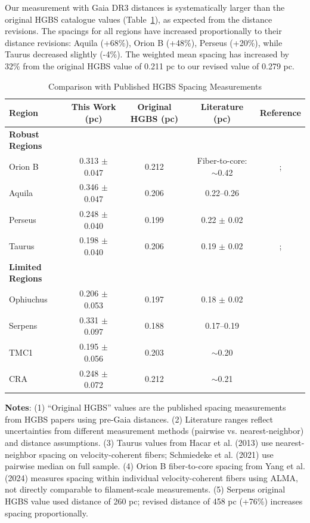 \documentclass[twoside,twocolumn]{mnras}
\begin{document}
Our measurement with Gaia DR3 distances is systematically larger than the original HGBS catalogue values (Table~\ref{tab:literature}), as expected from the distance revisions. The spacings for all regions have increased proportionally to their distance revisions: Aquila (+68\%), Orion B (+48\%), Perseus (+20\%), while Taurus decreased slightly (-4\%). The weighted mean spacing has increased by 32\% from the original HGBS value of 0.211 pc to our revised value of 0.279 pc.

\begin{table}
\caption{Comparison with Published HGBS Spacing Measurements}
\label{tab:literature}
\begin{tabular}{lcccc}
\toprule
Region & This Work (pc) & Original HGBS (pc) & Literature (pc) & Reference \\
\midrule
\textbf{Robust Regions} &  &  &  &  \\
Orion B & 0.313 $\pm$ 0.047 & 0.212 & Fiber-to-core: $\sim$0.42 & \citet{Konyves2020}; \citet{Yang2024} \\
Aquila  & 0.346 $\pm$ 0.047 & 0.206 & 0.22--0.26 & \citet{Konyves2015} \\
Perseus & 0.248 $\pm$ 0.040 & 0.199 & 0.22 $\pm$ 0.02 & \citet{Andre2016} \\
Taurus  & 0.198 $\pm$ 0.040 & 0.206 & 0.19 $\pm$ 0.02 & \citet{Hacar2013}; \citet{Schmiedeke2021} \\
\midrule
\textbf{Limited Regions} &  &  &  &  \\
Ophiuchus & 0.206 $\pm$ 0.053 & 0.197 & 0.18 $\pm$ 0.02 & \citet{Konyves2020} \\
Serpens  & 0.331 $\pm$ 0.097 & 0.188 & 0.17--0.19 & \citet{Konyves2020} \\
TMC1     & 0.195 $\pm$ 0.056 & 0.203 & $\sim$0.20 & \citet{Hacar2013} \\
CRA      & 0.248 $\pm$ 0.072 & 0.212 & $\sim$0.21 & \citet{Konyves2020} \\
\bottomrule
\end{tabular}

\vspace{0.1in}
\footnotesize
\textbf{Notes}: (1) ``Original HGBS'' values are the published spacing measurements from HGBS papers using pre-Gaia distances. (2) Literature ranges reflect uncertainties from different measurement methods (pairwise vs. nearest-neighbor) and distance assumptions. (3) Taurus values from Hacar et al. (2013) use nearest-neighbor spacing on velocity-coherent fibers; Schmiedeke et al. (2021) use pairwise median on full sample. (4) Orion B fiber-to-core spacing from Yang et al. (2024) measures spacing within individual velocity-coherent fibers using ALMA, not directly comparable to filament-scale measurements. (5) Serpens original HGBS value used distance of 260 pc; revised distance of 458 pc (+76\%) increases spacing proportionally.
\end{table}
\end{document}
